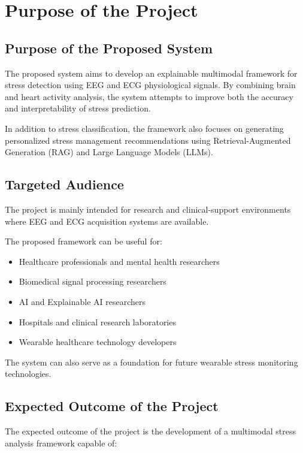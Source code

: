 \documentclass[12pt,a4paper]{report}
\begin{document}
\chapter{Purpose of the Project}

\section{Purpose of the Proposed System}

The proposed system aims to develop an explainable multimodal framework for stress detection using EEG and ECG physiological signals. By combining brain and heart activity analysis, the system attempts to improve both the accuracy and interpretability of stress prediction.

In addition to stress classification, the framework also focuses on generating personalized stress management recommendations using Retrieval-Augmented Generation (RAG) and Large Language Models (LLMs).

\section{Targeted Audience}

The project is mainly intended for research and clinical-support environments where EEG and ECG acquisition systems are available.

The proposed framework can be useful for:

\begin{itemize}
    \item Healthcare professionals and mental health researchers
    \item Biomedical signal processing researchers
    \item AI and Explainable AI researchers
    \item Hospitals and clinical research laboratories
    \item Wearable healthcare technology developers
\end{itemize}

The system can also serve as a foundation for future wearable stress monitoring technologies.

\section{Expected Outcome of the Project}

The expected outcome of the project is the development of a multimodal stress analysis framework capable of:
\end{document}
